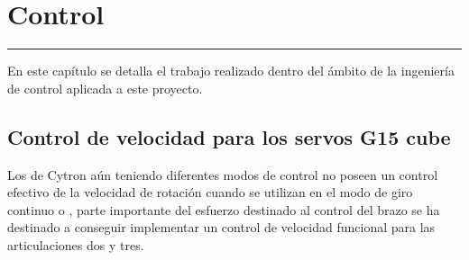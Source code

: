 \chapter{Control} \label{chap:Control}
\hrule
\vspace{3mm}
En este capítulo se detalla el trabajo realizado dentro del ámbito de la ingeniería de control aplicada a este proyecto.

\section{Control de velocidad para los servos G15 cube} \label{sec:Control:velocidad_g15}

Los  de Cytron aún teniendo diferentes modos de control no poseen un control efectivo de la velocidad de rotación cuando se utilizan en el modo de giro continuo o , parte importante del esfuerzo destinado al control del brazo se ha destinado a conseguir implementar un control de velocidad funcional para las articulaciones dos y tres.